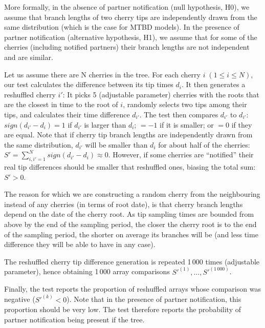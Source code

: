 \documentclass[a4paper,10pt]{article}
\begin{document}
More formally, in the absence of partner notification (null hypothesis, H0), we assume that branch lengths of two cherry tips are independently drawn from the same distribution (which is the case for MTBD models). In the presence of partner notification (alternative hypothesis, H1), we assume that for some of the cherries (including notified partners) their branch lengths are not independent and are similar. %

Let us assume there are N cherries in the tree. For each cherry $i\;(1 \leq i \leq N)$, our test calculates the difference between its tip times $d_i$. It then generates a reshuffled cherry $i'$: It picks 5 (adjustable parameter) cherries with the roots that are the closest in time to the root of $i$, randomly selects two tips among their tips, and calculates their time difference $d_{i'}$. The test then compares $d_{i'}$ to $d_{i'}$: $sign(d_{i'} - d_i) = 1$ if $d_{i'}$ is larger than $d_i$; $= -1$ if it is smaller; or $= 0$ if they are equal. Note that if cherry tip branch lengths are independently drawn from the same distribution, $d_{i'}$ will be smaller than $d_i$ for about half of the cherries: $S' =  \sum\limits_{i,i'=1}^N sign(d_{i'} - d_i) \approx 0$. However, if some cherries are ``notified'' their real tip differences should be smaller that reshuffled ones, biasing the total sum: $S' > 0$. 

The reason for which we are constructing a random cherry from the neighbouring instead of any cherries (in terms of root date), is that cherry branch lengths depend on the date of the cherry root. As tip sampling times are bounded from above by the end of the sampling period, the closer the cherry root is to the end of the sampling period, the shorter on average its branches will be (and less time difference they will be able to have in any case). 

The reshuffled cherry tip difference generation is repeated 1\,000 times (adjustable parameter), hence obtaining 1\,000 array comparisons $S'^{(1)}, \ldots, S'^{(1\,000)}$. 

Finally, the test reports the proportion of reshuffled arrays whose comparison was negative ($S'^{(k)} < 0$). Note that in the presence of partner notification, this proportion should be very low. 
The test therefore reports the probability of partner notification being present if the tree. 
\end{document}
